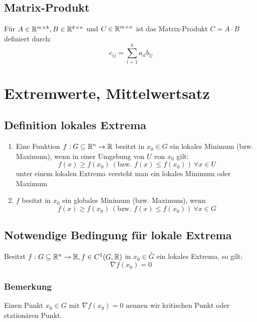 \subsection{Matrix-Produkt}
Für $A \in \mathbb{R}^{m \times k}, B \in \mathbb{R}^{k \times n}$ und $C \in \mathbb{R}^{m \times n}$
ist das Matrix-Produkt $C = A \cdot B$ definiert durch:
\begin{equation*}
    c_{ij} = \sum_{l=1}^k a_{il} b_{lj}
\end{equation*}

\section{Extremwerte, Mittelwertsatz}

\subsection{Definition lokales Extrema}
\begin{enumerate}[label= (\alph*)]
    \item Eine Funktion $f: G \subseteq \mathbb{R}^n \rightarrow \mathbb{R}$ besitzt in $x_0 \in G$ ein
        lokales Minimum (bzw. Maximum), wenn in einer Umgebung von $U$ von $x_0$ gilt:
        \begin{equation*}
            f(x) \geq  f(x_0)\ (\text{bzw. } f(x) \leq f(x_0))\ \forall x \in U
        \end{equation*}
        unter einem lokalen Extrema versteht man ein lokales Minimum oder Maximum
    \item $f$ besitzt in $x_0$ ein globales Minimum (bzw. Maximum), wenn
        \begin{equation*}
            f(x) \geq f(x_0)\ (\text{bzw. } f(x) \leq f(x_0))\ \forall x \in G
        \end{equation*}
\end{enumerate}

\subsection{Notwendige Bedingung für lokale Extrema}
Besitzt $f: G \subseteq \mathbb{R}^n \rightarrow \mathbb{R}, f \in C^1(G, \mathbb{R})$ in
$x_0 \in \overset{\circ}{G}$ ein lokales Extrema, so gilt:
\begin{equation*}
    \nabla f(x_0) = 0
\end{equation*}

\subsubsection{Bemerkung}
Einen Punkt $x_0 \in G$ mit $\nabla f(x_0) = 0$ nennen wir kritischen Punkt oder
stationären Punkt.

